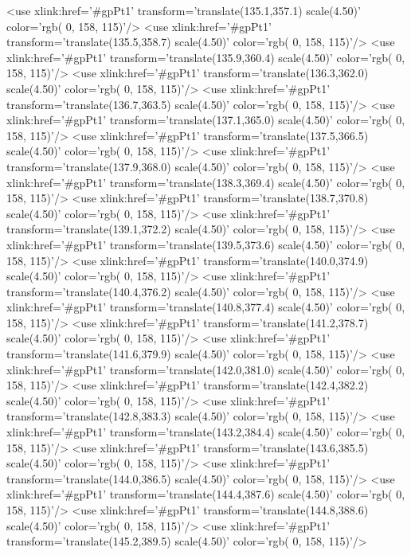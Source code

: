 	<use xlink:href='#gpPt1' transform='translate(135.1,357.1) scale(4.50)' color='rgb(  0, 158, 115)'/>
	<use xlink:href='#gpPt1' transform='translate(135.5,358.7) scale(4.50)' color='rgb(  0, 158, 115)'/>
	<use xlink:href='#gpPt1' transform='translate(135.9,360.4) scale(4.50)' color='rgb(  0, 158, 115)'/>
	<use xlink:href='#gpPt1' transform='translate(136.3,362.0) scale(4.50)' color='rgb(  0, 158, 115)'/>
	<use xlink:href='#gpPt1' transform='translate(136.7,363.5) scale(4.50)' color='rgb(  0, 158, 115)'/>
	<use xlink:href='#gpPt1' transform='translate(137.1,365.0) scale(4.50)' color='rgb(  0, 158, 115)'/>
	<use xlink:href='#gpPt1' transform='translate(137.5,366.5) scale(4.50)' color='rgb(  0, 158, 115)'/>
	<use xlink:href='#gpPt1' transform='translate(137.9,368.0) scale(4.50)' color='rgb(  0, 158, 115)'/>
	<use xlink:href='#gpPt1' transform='translate(138.3,369.4) scale(4.50)' color='rgb(  0, 158, 115)'/>
	<use xlink:href='#gpPt1' transform='translate(138.7,370.8) scale(4.50)' color='rgb(  0, 158, 115)'/>
	<use xlink:href='#gpPt1' transform='translate(139.1,372.2) scale(4.50)' color='rgb(  0, 158, 115)'/>
	<use xlink:href='#gpPt1' transform='translate(139.5,373.6) scale(4.50)' color='rgb(  0, 158, 115)'/>
	<use xlink:href='#gpPt1' transform='translate(140.0,374.9) scale(4.50)' color='rgb(  0, 158, 115)'/>
	<use xlink:href='#gpPt1' transform='translate(140.4,376.2) scale(4.50)' color='rgb(  0, 158, 115)'/>
	<use xlink:href='#gpPt1' transform='translate(140.8,377.4) scale(4.50)' color='rgb(  0, 158, 115)'/>
	<use xlink:href='#gpPt1' transform='translate(141.2,378.7) scale(4.50)' color='rgb(  0, 158, 115)'/>
	<use xlink:href='#gpPt1' transform='translate(141.6,379.9) scale(4.50)' color='rgb(  0, 158, 115)'/>
	<use xlink:href='#gpPt1' transform='translate(142.0,381.0) scale(4.50)' color='rgb(  0, 158, 115)'/>
	<use xlink:href='#gpPt1' transform='translate(142.4,382.2) scale(4.50)' color='rgb(  0, 158, 115)'/>
	<use xlink:href='#gpPt1' transform='translate(142.8,383.3) scale(4.50)' color='rgb(  0, 158, 115)'/>
	<use xlink:href='#gpPt1' transform='translate(143.2,384.4) scale(4.50)' color='rgb(  0, 158, 115)'/>
	<use xlink:href='#gpPt1' transform='translate(143.6,385.5) scale(4.50)' color='rgb(  0, 158, 115)'/>
	<use xlink:href='#gpPt1' transform='translate(144.0,386.5) scale(4.50)' color='rgb(  0, 158, 115)'/>
	<use xlink:href='#gpPt1' transform='translate(144.4,387.6) scale(4.50)' color='rgb(  0, 158, 115)'/>
	<use xlink:href='#gpPt1' transform='translate(144.8,388.6) scale(4.50)' color='rgb(  0, 158, 115)'/>
	<use xlink:href='#gpPt1' transform='translate(145.2,389.5) scale(4.50)' color='rgb(  0, 158, 115)'/>
